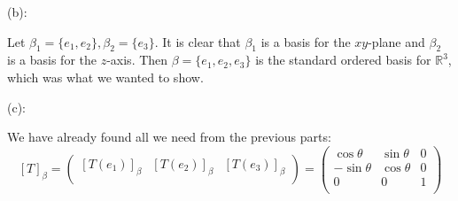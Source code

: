 \documentclass{eh-homework}
\begin{document}
\begin{question}{11}
        \medskip

        (b):

        Let \(\beta_1 = \{ e_1, e_2 \}, \beta _2 = \{ e_3 \}\). It is clear that \(\beta _1\) is a basis for the \(xy\)-plane and \(\beta _2\) is a basis for the \(z\)-axis. Then \(\beta = \{ e_1, e_2, e_3 \}\) is the standard ordered basis for \(\mathbb{R}^3\), which was what we wanted to show.

        \medskip

        (c):

        We have already found all we need from the previous parts:
        \[
            [T]_\beta = \begin{pmatrix}
                [T(e_1)]_\beta & [T(e_2)]_\beta &  [T(e_3)]_\beta \\
            \end{pmatrix}
            =
            \begin{pmatrix}
                \cos \theta & \sin \theta &  0 \\
                -\sin \theta & \cos \theta &  0 \\
                0 & 0 &  1 \\
            \end{pmatrix}
        \]
    \end{question}
    \newpage
\end{document}
